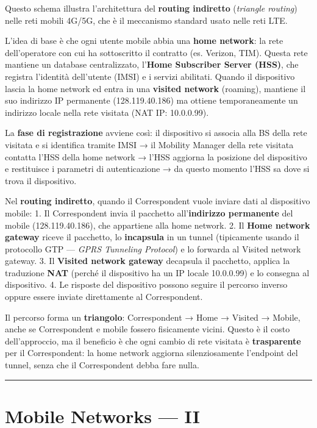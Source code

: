 \documentclass[
  italian,
  openany]{book}
\begin{document}
Questo schema illustra l'architettura del \textbf{routing indiretto}
(\emph{triangle routing}) nelle reti mobili 4G/5G, che è il meccanismo
standard usato nelle reti LTE.

L'idea di base è che ogni utente mobile abbia una \textbf{home network}:
la rete dell'operatore con cui ha sottoscritto il contratto (es.
Verizon, TIM). Questa rete mantiene un database centralizzato,
l'\textbf{Home Subscriber Server (HSS)}, che registra l'identità
dell'utente (IMSI) e i servizi abilitati. Quando il dispositivo lascia
la home network ed entra in una \textbf{visited network} (roaming),
mantiene il suo indirizzo IP permanente (128.119.40.186) ma ottiene
temporaneamente un indirizzo locale nella rete visitata (NAT IP:
10.0.0.99).

La \textbf{fase di registrazione} avviene così: il dispositivo si
associa alla BS della rete visitata e si identifica tramite IMSI → il
Mobility Manager della rete visitata contatta l'HSS della home network →
l'HSS aggiorna la posizione del dispositivo e restituisce i parametri di
autenticazione → da questo momento l'HSS sa dove si trova il
dispositivo.

Nel \textbf{routing indiretto}, quando il Correspondent vuole inviare
dati al dispositivo mobile: 1. Il Correspondent invia il pacchetto
all'\textbf{indirizzo permanente} del mobile (128.119.40.186), che
appartiene alla home network. 2. Il \textbf{Home network gateway} riceve
il pacchetto, lo \textbf{incapsula} in un tunnel (tipicamente usando il
protocollo GTP --- \emph{GPRS Tunneling Protocol}) e lo forwarda al
Visited network gateway. 3. Il \textbf{Visited network gateway}
decapsula il pacchetto, applica la traduzione \textbf{NAT} (perché il
dispositivo ha un IP locale 10.0.0.99) e lo consegna al dispositivo. 4.
Le risposte del dispositivo possono seguire il percorso inverso oppure
essere inviate direttamente al Correspondent.

Il percorso forma un \textbf{triangolo}: Correspondent → Home → Visited
→ Mobile, anche se Correspondent e mobile fossero fisicamente vicini.
Questo è il costo dell'approccio, ma il beneficio è che ogni cambio di
rete visitata è \textbf{trasparente} per il Correspondent: la home
network aggiorna silenziosamente l'endpoint del tunnel, senza che il
Correspondent debba fare nulla.

\begin{center}\rule{0.5\linewidth}{0.5pt}\end{center}

\section{Mobile Networks --- II}\label{mobile-networks-ii}
\end{document}
